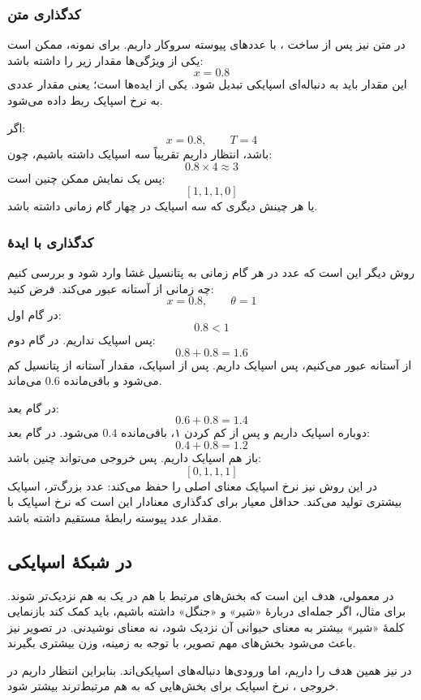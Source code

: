 \subsubsection{کدگذاری متن}
در متن نیز پس از ساخت ، با عددهای پیوسته سروکار داریم. برای نمونه، ممکن است یکی از ویژگی‌ها مقدار زیر را داشته باشد:
\[
x = 0.8
\]
این مقدار باید به دنباله‌ای اسپایکی تبدیل شود. یکی از ایده‌ها  است؛ یعنی مقدار عددی به نرخ اسپایک ربط داده می‌شود.

اگر:
\[
x = 0.8,\qquad T = 4
\]
باشد، انتظار داریم تقریباً سه اسپایک داشته باشیم، چون:
\[
0.8 \times 4 \approx 3
\]
پس یک نمایش ممکن چنین است:
\[
[1,1,1,0]
\]
یا هر چینش دیگری که سه اسپایک در چهار گام زمانی داشته باشد.

\subsubsection{کدگذاری با ایدهٔ }
روش دیگر این است که عدد در هر گام زمانی به پتانسیل غشا وارد شود و بررسی کنیم چه زمانی از آستانه عبور می‌کند. فرض کنید:
\[
x = 0.8,\qquad \theta = 1
\]
در گام اول:
\[
0.8 < 1
\]
پس اسپایک نداریم. در گام دوم:
\[
0.8 + 0.8 = 1.6
\]
از آستانه عبور می‌کنیم، پس اسپایک داریم. پس از اسپایک، مقدار آستانه از پتانسیل کم می‌شود و باقی‌مانده \(0.6\) می‌ماند.

در گام بعد:
\[
0.6 + 0.8 = 1.4
\]
دوباره اسپایک داریم و پس از کم کردن ۱، باقی‌مانده \(0.4\) می‌شود. در گام بعد:
\[
0.4 + 0.8 = 1.2
\]
باز هم اسپایک داریم. پس خروجی می‌تواند چنین باشد:
\[
[0,1,1,1]
\]
در این روش نیز نرخ اسپایک معنای اصلی را حفظ می‌کند: عدد بزرگ‌تر، اسپایک بیشتری تولید می‌کند. حداقل معیار برای کدگذاری معنادار این است که نرخ اسپایک با مقدار عدد پیوسته رابطهٔ مستقیم داشته باشد.

\subsection{ در شبکهٔ اسپایکی}
در  معمولی، هدف  این است که بخش‌های مرتبط با هم در یک  به هم نزدیک‌تر شوند. برای مثال، اگر جمله‌ای دربارهٔ «شیر» و «جنگل» داشته باشیم،  باید کمک کند بازنمایی کلمهٔ «شیر» بیشتر به معنای حیوانی آن نزدیک شود، نه معنای نوشیدنی. در تصویر نیز  باعث می‌شود بخش‌های مهم تصویر، با توجه به زمینه، وزن بیشتری بگیرند.

در  نیز همین هدف را داریم، اما ورودی‌ها دنباله‌های اسپایکی‌اند. بنابراین انتظار داریم در خروجی ، نرخ اسپایک برای بخش‌هایی که به هم مرتبط‌ترند بیشتر شود.

